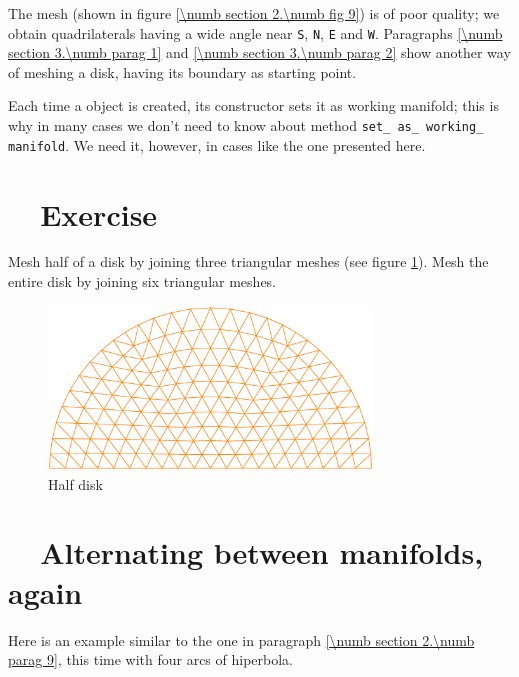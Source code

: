 The mesh (shown in figure \ref{\numb section 2.\numb fig 9}) is of poor quality;
we obtain quadrilaterals having a wide angle near {\small\tt S}, {\small\tt N}, {\small\tt E}
and {\small\tt W}.
Paragraphs \ref{\numb section 3.\numb parag 1} and \ref{\numb section 3.\numb parag 2} show
another way of meshing a disk, having its boundary as starting point.

Each time a {\small\tt{}} object is created, its constructor sets it as
working manifold; this is why in many cases we don't need to know about method
{\small\tt set\_\,as\_\,working\_\,manifold}.
We need it, however, in cases like the one presented here.


\section{~~Exercise}\label{\numb section 2.\numb parag 10}

Mesh half of a disk by joining three triangular meshes
(see figure \ref{\numb section 2.\numb fig 10}).
Mesh the entire disk by joining six triangular meshes.

\begin{figure}[ht] \centering
  \includegraphics[width=86mm]{half-disk}
  \caption{Half disk}
  \label{\numb section 2.\numb fig 10}
\end{figure}


\section{~~Alternating between manifolds, again}\label{\numb section 2.\numb parag 11}

Here is an example similar to the one in paragraph \ref{\numb section 2.\numb parag 9},
this time with four arcs of hiperbola.

